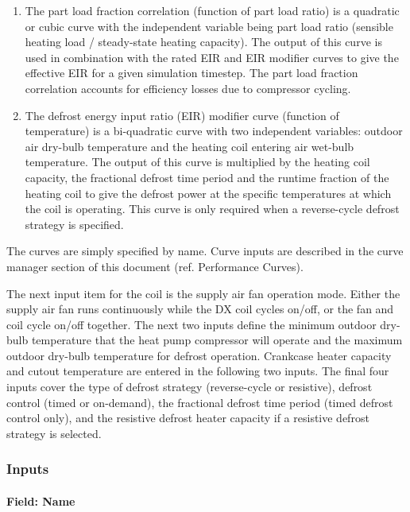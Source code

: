 \begin{enumerate}
\item
  The part load fraction correlation (function of part load ratio) is a quadratic or cubic curve with the independent variable being part load ratio (sensible heating load / steady-state heating capacity). The output of this curve is used in combination with the rated EIR and EIR modifier curves to give the effective EIR for a given simulation timestep. The part load fraction correlation accounts for efficiency losses due to compressor cycling.
\item
  The defrost energy input ratio (EIR) modifier curve (function of temperature) is a bi-quadratic curve with two independent variables: outdoor air dry-bulb temperature and the heating coil entering air wet-bulb temperature. The output of this curve is multiplied by the heating coil capacity, the fractional defrost time period and the runtime fraction of the heating coil to give the defrost power at the specific temperatures at which the coil is operating. This curve is only required when a reverse-cycle defrost strategy is specified.
\end{enumerate}

The curves are simply specified by name. Curve inputs are described in the curve manager section of this document (ref. Performance Curves).

The next input item for the coil is the supply air fan operation mode. Either the supply air fan runs continuously while the DX coil cycles on/off, or the fan and coil cycle on/off together. The next two inputs define the minimum outdoor dry-bulb temperature that the heat pump compressor will operate and the maximum outdoor dry-bulb temperature for defrost operation. Crankcase heater capacity and cutout temperature are entered in the following two inputs. The final four inputs cover the type of defrost strategy (reverse-cycle or resistive), defrost control (timed or on-demand), the fractional defrost time period (timed defrost control only), and the resistive defrost heater capacity if a resistive defrost strategy is selected.

\subsubsection{Inputs}\label{inputs-19-001}

\paragraph{Field: Name}\label{field-name-18-001}

